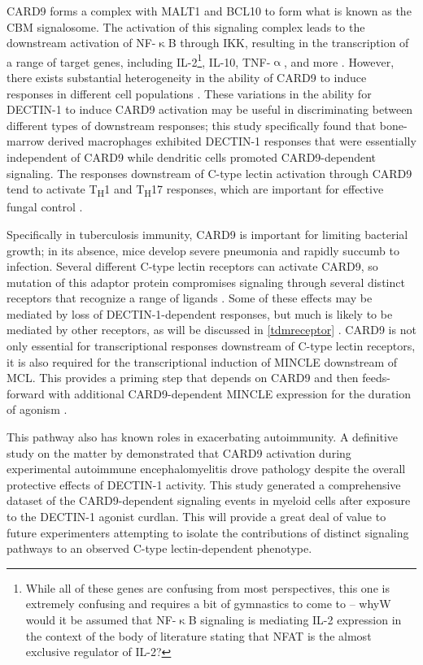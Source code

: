 CARD9 forms a complex with MALT1 and BCL10 to form what is known as the CBM signalosome. The activation of this signaling complex leads to the downstream activation of NF\hyp{}$\upkappa$B through IKK, resulting in the transcription of a range of target genes, including IL\hyp{}2\footnote{While all of these genes are confusing from most perspectives, this one is extremely confusing and requires a bit of gymnastics to come to -- whyW would it be assumed that NF\hyp{}$\upkappa$B signaling is mediating IL\hyp{}2 expression in the context of the body of literature stating that NFAT is the almost exclusive regulator of IL\hyp{}2?}, IL\hyp{}10, TNF\hyp{}$\upalpha$, and more \citep{Sancho2012}. However, there exists substantial heterogeneity in the ability of CARD9 to induce responses in different cell populations \citep{Goodridge2009}. These variations in the ability for DECTIN\hyp{}1 to induce CARD9 activation may be useful in discriminating between different types of downstream responses; this study specifically found that bone\hyp{}marrow derived macrophages exhibited DECTIN\hyp{}1 responses that were essentially independent of CARD9 while dendritic cells promoted CARD9\hyp{}dependent signaling. The responses downstream of C\hyp{}type lectin activation through CARD9 tend to activate T\textsubscript{H}1 and T\textsubscript{H}17 responses, which are important for effective fungal control \citep{Drummond2011a}.

Specifically in tuberculosis immunity, CARD9 is important for limiting bacterial growth; in its absence, mice develop severe pneumonia and rapidly succumb to infection. Several different C\hyp{}type lectin receptors can activate CARD9, so mutation of this adaptor protein compromises signaling through several distinct receptors that recognize a range of ligands \citep{Wagener2018}. Some of these effects may be mediated by loss of DECTIN\hyp{}1\hyp{}dependent responses, but much is likely to be mediated by other receptors, as will be discussed in \autoref{tdmreceptor} \citep{Marakalala2010, Marakalala2017}. CARD9 is not only essential for transcriptional responses downstream of C\hyp{}type lectin receptors, it is also required for the transcriptional induction of MINCLE downstream of MCL. This provides a priming step that depends on CARD9 and then feeds\hyp{}forward with additional CARD9\hyp{}dependent MINCLE expression for the duration of agonism \citep{Zhao2014}.

This pathway also has known roles in exacerbating autoimmunity. A definitive study on the matter by \citet{Deerhake2021} demonstrated that CARD9 activation during experimental autoimmune encephalomyelitis drove pathology despite the overall protective effects of DECTIN\hyp{}1 activity. This study generated a comprehensive dataset of the CARD9\hyp{}dependent signaling events in myeloid cells after exposure to the DECTIN\hyp{}1 agonist curdlan. This will provide a great deal of value to future experimenters attempting to isolate the contributions of distinct signaling pathways to an observed C\hyp{}type lectin\hyp{}dependent phenotype.

